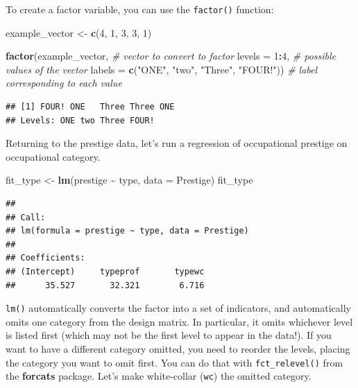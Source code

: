 \documentclass[
  12pt,
  oneside,openany]{book}
\newenvironment{Shaded}{\begin{snugshade}}{\end{snugshade}}
\newcommand{\CommentTok}[1]{\textcolor[rgb]{0.56,0.35,0.01}{\textit{#1}}}
\newcommand{\DataTypeTok}[1]{\textcolor[rgb]{0.13,0.29,0.53}{#1}}
\newcommand{\DecValTok}[1]{\textcolor[rgb]{0.00,0.00,0.81}{#1}}
\newcommand{\KeywordTok}[1]{\textcolor[rgb]{0.13,0.29,0.53}{\textbf{#1}}}
\newcommand{\NormalTok}[1]{#1}
\newcommand{\OperatorTok}[1]{\textcolor[rgb]{0.81,0.36,0.00}{\textbf{#1}}}
\newcommand{\StringTok}[1]{\textcolor[rgb]{0.31,0.60,0.02}{#1}}
\begin{document}
To create a factor variable, you can use the \texttt{factor()} function:

\begin{Shaded}
\begin{Highlighting}[]
\NormalTok{example\_vector <{-}}\StringTok{ }\KeywordTok{c}\NormalTok{(}\DecValTok{4}\NormalTok{, }\DecValTok{1}\NormalTok{, }\DecValTok{3}\NormalTok{, }\DecValTok{3}\NormalTok{, }\DecValTok{1}\NormalTok{)}

\KeywordTok{factor}\NormalTok{(example\_vector,  }\CommentTok{\# vector to convert to factor}
       \DataTypeTok{levels =} \DecValTok{1}\OperatorTok{:}\DecValTok{4}\NormalTok{,    }\CommentTok{\# possible values of the vector}
       \DataTypeTok{labels =} \KeywordTok{c}\NormalTok{(}\StringTok{"ONE"}\NormalTok{,}
                  \StringTok{"two"}\NormalTok{,}
                  \StringTok{"Three"}\NormalTok{,}
                  \StringTok{"FOUR!"}\NormalTok{))  }\CommentTok{\# label corresponding to each value}
\end{Highlighting}
\end{Shaded}

\begin{verbatim}
## [1] FOUR! ONE   Three Three ONE  
## Levels: ONE two Three FOUR!
\end{verbatim}

Returning to the prestige data, let's run a regression of occupational prestige on occupational category.

\begin{Shaded}
\begin{Highlighting}[]
\NormalTok{fit\_type <{-}}\StringTok{ }\KeywordTok{lm}\NormalTok{(prestige }\OperatorTok{\textasciitilde{}}\StringTok{ }\NormalTok{type, }\DataTypeTok{data =}\NormalTok{ Prestige)}
\NormalTok{fit\_type}
\end{Highlighting}
\end{Shaded}

\begin{verbatim}
## 
## Call:
## lm(formula = prestige ~ type, data = Prestige)
## 
## Coefficients:
## (Intercept)     typeprof       typewc  
##      35.527       32.321        6.716
\end{verbatim}

\texttt{lm()} automatically converts the factor into a set of indicators, and automatically omits one category from the design matrix. In particular, it omits whichever level is listed first (which may not be the first level to appear in the data!). If you want to have a different category omitted, you need to reorder the levels, placing the category you want to omit first. You can do that with \texttt{fct\_relevel()} from the \textbf{forcats} package. Let's make white-collar (\texttt{wc}) the omitted category.
\end{document}
